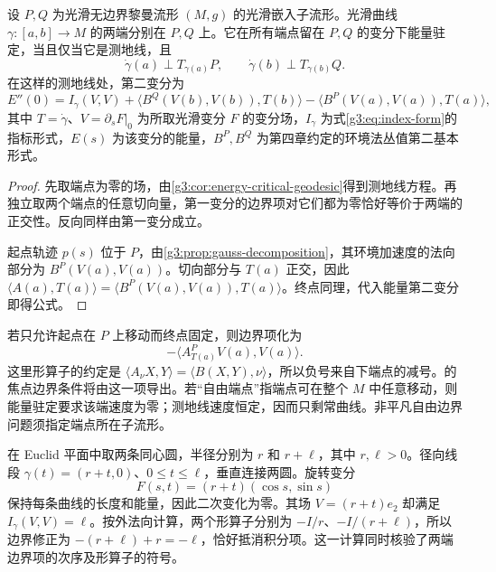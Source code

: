 \begin{proposition}\label{g3:prop:submanifold-endpoint-variation}
	设 \(P,Q\) 为光滑无边界黎曼流形 \((M,g)\) 的光滑嵌入子流形。光滑曲线 \(\gamma:[a,b]\to M\) 的两端分别在 \(P,Q\) 上。它在所有端点留在 \(P,Q\) 的变分下能量驻定，当且仅当它是测地线，且
	\[
		\dot\gamma(a)\perp T_{\gamma(a)}P,\qquad
		\dot\gamma(b)\perp T_{\gamma(b)}Q.
	\]
	在这样的测地线处，第二变分为
	\begin{equation}\label{g3:eq:submanifold-endpoint-hessian}
		E''(0)=I_\gamma(V,V)
		+\langle B^Q(V(b),V(b)),T(b)\rangle
		-\langle B^P(V(a),V(a)),T(a)\rangle,
	\end{equation}
	其中 \(T=\dot\gamma\)、\(V=\partial_sF|_0\) 为所取光滑变分 \(F\) 的变分场，\(I_\gamma\) 为式\eqref{g3:eq:index-form}的指标形式，\(E(s)\) 为该变分的能量，\(B^P,B^Q\) 为第四章约定的环境法丛值第二基本形式。
\end{proposition}
\begin{proof}
	先取端点为零的场，由\cref{g3:cor:energy-critical-geodesic}得到测地线方程。再独立取两个端点的任意切向量，第一变分的边界项对它们都为零恰好等价于两端的正交性。反向同样由第一变分成立。

	起点轨迹 \(p(s)\) 位于 \(P\)，由\cref{g3:prop:gauss-decomposition}，其环境加速度的法向部分为 \(B^P(V(a),V(a))\)。切向部分与 \(T(a)\) 正交，因此
	\(\langle A(a),T(a)\rangle=\langle B^P(V(a),V(a)),T(a)\rangle\)。终点同理，代入能量第二变分即得公式。
\end{proof}

若只允许起点在 \(P\) 上移动而终点固定，则边界项化为
\[
	-\langle A_{T(a)}^P V(a),V(a)\rangle.
\]
这里形算子的约定是 \(\langle A_\nu X,Y\rangle=\langle B(X,Y),\nu\rangle\)，所以负号来自下端点的减号。的焦点边界条件将由这一项导出。若“自由端点”指端点可在整个 \(M\) 中任意移动，则能量驻定要求该端速度为零；测地线速度恒定，因而只剩常曲线。非平凡自由边界问题须指定端点所在子流形。

\begin{example}\label{g3:exm:concentric-circles-boundary-hessian}
	在 Euclid 平面中取两条同心圆，半径分别为 \(r\) 和 \(r+\ell\)，其中 \(r,\ell>0\)。径向线段 \(\gamma(t)=(r+t,0)\)、\(0\le t\le\ell\)，垂直连接两圆。旋转变分
	\[
		F(s,t)=(r+t)(\cos s,\sin s)
	\]
	保持每条曲线的长度和能量，因此二次变化为零。其场 \(V=(r+t)e_2\) 却满足 \(I_\gamma(V,V)=\ell\)。按外法向计算，两个形算子分别为 \(-I/r\)、\(-I/(r+\ell)\)，所以边界修正为 \(-(r+\ell)+r=-\ell\)，恰好抵消积分项。这一计算同时核验了两端边界项的次序及形算子的符号。
\end{example}
